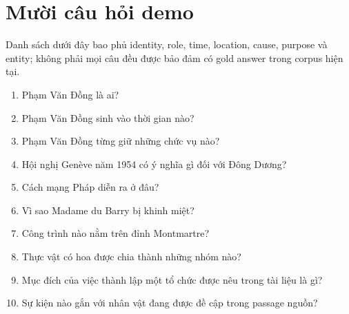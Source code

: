 \documentclass[12pt,a4paper,oneside]{report}
\begin{document}
\chapter{Mười câu hỏi demo}
Danh sách dưới đây bao phủ identity, role, time, location, cause, purpose và entity;
không phải mọi câu đều được bảo đảm có gold answer trong corpus hiện tại.
\begin{enumerate}
  \item Phạm Văn Đồng là ai?
  \item Phạm Văn Đồng sinh vào thời gian nào?
  \item Phạm Văn Đồng từng giữ những chức vụ nào?
  \item Hội nghị Genève năm 1954 có ý nghĩa gì đối với Đông Dương?
  \item Cách mạng Pháp diễn ra ở đâu?
  \item Vì sao Madame du Barry bị khinh miệt?
  \item Công trình nào nằm trên đỉnh Montmartre?
  \item Thực vật có hoa được chia thành những nhóm nào?
  \item Mục đích của việc thành lập một tổ chức được nêu trong tài liệu là gì?
  \item Sự kiện nào gắn với nhân vật đang được đề cập trong passage nguồn?
\end{enumerate}
\end{document}
